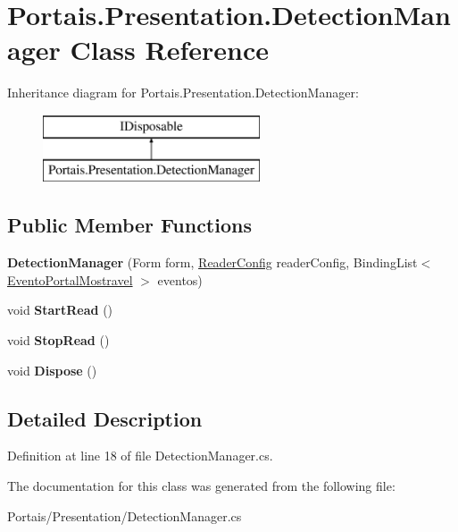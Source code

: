 \hypertarget{class_portais_1_1_presentation_1_1_detection_manager}{}\section{Portais.\+Presentation.\+Detection\+Manager Class Reference}
\label{class_portais_1_1_presentation_1_1_detection_manager}
Inheritance diagram for Portais.\+Presentation.\+Detection\+Manager\+:\begin{figure}[H]
\begin{center}
\leavevmode
\includegraphics[height=2.000000cm]{class_portais_1_1_presentation_1_1_detection_manager}
\end{center}
\end{figure}
\subsection*{Public Member Functions}
\begin{DoxyCompactItemize}
\item 
{\bfseries Detection\+Manager} (Form form, \hyperlink{class_cruzeiro_1_1_core_1_1_model_1_1_reader_config}{Reader\+Config} reader\+Config, Binding\+List$<$ \hyperlink{class_portais_1_1_model_1_1_evento_portal_mostravel}{Evento\+Portal\+Mostravel} $>$ eventos)\hypertarget{class_portais_1_1_presentation_1_1_detection_manager_a4176019497406fe54f64129886035fa4}{}\label{class_portais_1_1_presentation_1_1_detection_manager_a4176019497406fe54f64129886035fa4}

\item 
void {\bfseries Start\+Read} ()\hypertarget{class_portais_1_1_presentation_1_1_detection_manager_ad6f58de37594c41591ea8b5eeafb1f50}{}\label{class_portais_1_1_presentation_1_1_detection_manager_ad6f58de37594c41591ea8b5eeafb1f50}

\item 
void {\bfseries Stop\+Read} ()\hypertarget{class_portais_1_1_presentation_1_1_detection_manager_ad5da5320a38c5d0b29d5f6dbe27c6c3b}{}\label{class_portais_1_1_presentation_1_1_detection_manager_ad5da5320a38c5d0b29d5f6dbe27c6c3b}

\item 
void {\bfseries Dispose} ()\hypertarget{class_portais_1_1_presentation_1_1_detection_manager_aad57193a71bde15c2cfade13e5b67ecd}{}\label{class_portais_1_1_presentation_1_1_detection_manager_aad57193a71bde15c2cfade13e5b67ecd}

\end{DoxyCompactItemize}


\subsection{Detailed Description}


Definition at line 18 of file Detection\+Manager.\+cs.



The documentation for this class was generated from the following file\+:\begin{DoxyCompactItemize}
\item 
Portais/\+Presentation/Detection\+Manager.\+cs\end{DoxyCompactItemize}
